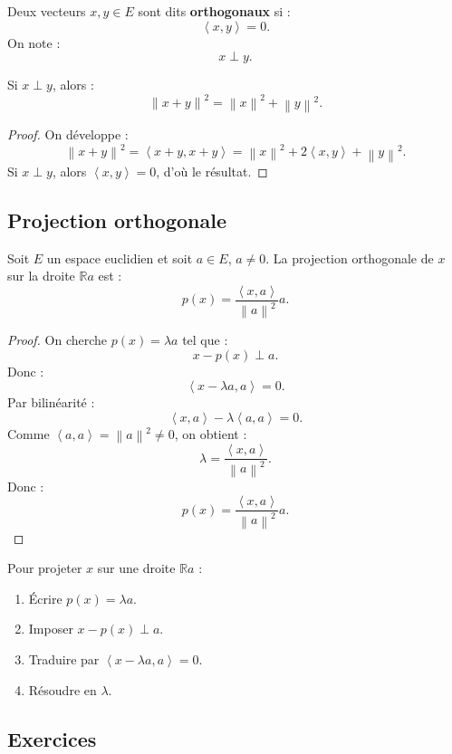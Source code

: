 \documentclass[11pt,a4paper]{article}
\newcommand{\R}{\mathbb R}
\newcommand{\norme}[1]{\left\lVert #1 \right\rVert}
\newcommand{\scal}[2]{\left\langle #1,#2\right\rangle}
\begin{document}
\begin{definitionbox}[Orthogonalité]
Deux vecteurs \(x,y\in E\) sont dits \textbf{orthogonaux} si :
\[
\scal{x}{y}=0.
\]
On note :
\[
x\perp y.
\]
\end{definitionbox}

\begin{theorembox}[Pythagore]
Si \(x\perp y\), alors :
\[
\norme{x+y}^2=\norme{x}^2+\norme{y}^2.
\]
\end{theorembox}

\begin{proof}
On développe :
\[
\norme{x+y}^2
=\scal{x+y}{x+y}
=\norme{x}^2+2\scal{x}{y}+\norme{y}^2.
\]
Si \(x\perp y\), alors \(\scal{x}{y}=0\), d'où le résultat.
\end{proof}

\subsection{Projection orthogonale}

\begin{theorembox}
Soit \(E\) un espace euclidien et soit \(a\in E\), \(a\neq0\).  
La projection orthogonale de \(x\) sur la droite \(\R a\) est :
\[
p(x)=\frac{\scal{x}{a}}{\norme{a}^2}a.
\]
\end{theorembox}

\begin{proof}
On cherche \(p(x)=\lambda a\) tel que :
\[
x-p(x)\perp a.
\]
Donc :
\[
\scal{x-\lambda a}{a}=0.
\]
Par bilinéarité :
\[
\scal{x}{a}-\lambda\scal{a}{a}=0.
\]
Comme \(\scal{a}{a}=\norme{a}^2\neq0\), on obtient :
\[
\lambda=\frac{\scal{x}{a}}{\norme{a}^2}.
\]
Donc :
\[
p(x)=\frac{\scal{x}{a}}{\norme{a}^2}a.
\]
\end{proof}

\begin{methodbox}
Pour projeter \(x\) sur une droite \(\R a\) :
\begin{enumerate}
    \item Écrire \(p(x)=\lambda a\).
    \item Imposer \(x-p(x)\perp a\).
    \item Traduire par \(\scal{x-\lambda a}{a}=0\).
    \item Résoudre en \(\lambda\).
\end{enumerate}
\end{methodbox}

\subsection{Exercices}
\end{document}
